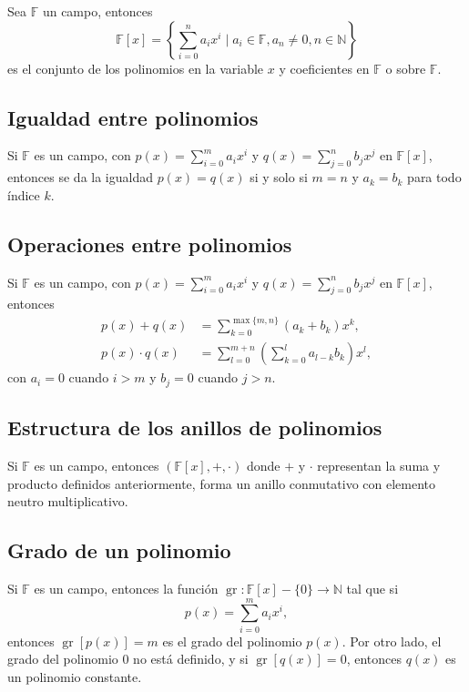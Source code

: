 \documentclass{article}
\DeclareMathOperator{\gr}{gr}
\begin{document}
Sea $\mathbb{F}$ un campo, entonces 
$$\mathbb{F}[x]=\left\{\sum_{i=0}^n a_ix^i \mid a_i\in\mathbb{F}, a_n\neq 0, n\in\mathbb{N}\right\}$$ 
es el conjunto de los polinomios en la variable $x$ y coeficientes en $\mathbb{F}$ o sobre $\mathbb{F}$.

\subsection*{\color{violet} Igualdad entre polinomios}

Si $\mathbb{F}$ es un campo, con $p(x)=\displaystyle \sum_{i=0}^m a_ix^i$ y $q(x)=\displaystyle \sum_{j=0}^n b_jx^j$ en $\mathbb{F}[x]$, entonces se da la igualdad $p(x)=q(x)$ si y solo si $m=n$ y $a_k=b_k$ para todo índice $k$.

\subsection*{\color{violet} Operaciones entre polinomios}

Si $\mathbb{F}$ es un campo, con $p(x)=\displaystyle \sum_{i=0}^m a_ix^i$ y $q(x)=\displaystyle \sum_{j=0}^n b_jx^j$ en $\mathbb{F}[x]$, entonces
\begin{align*}
p(x)+q(x)&=\sum_{k=0}^{\max\{m,n\}}(a_k+b_k)x^k,\\
p(x)\cdot q(x)&=\sum_{l=0}^{m+n}\left(\sum_{k=0}^l a_{l-k}b_k\right)x^l,
\end{align*}
con $a_i=0$ cuando $i>m$ y $b_j=0$ cuando $j>n$.

\subsection*{\color{purple} Estructura de los anillos de polinomios}

Si $\mathbb{F}$ es un campo, entonces $(\mathbb{F}[x],+,\cdot)$ donde $+$ y $\cdot$ representan la suma y producto definidos anteriormente, forma un anillo conmutativo con elemento neutro multiplicativo.

\subsection*{\color{violet} Grado de un polinomio}

Si $\mathbb{F}$ es un campo, entonces la función $\gr: \mathbb{F}[x]-\{0\}\to \mathbb{N}$ tal que si
$$p(x)=\sum_{i=0}^m a_ix^i,$$
entonces $\gr[p(x)]=m$ es el grado del polinomio $p(x)$. Por otro lado, el grado del polinomio 0 no está definido, y si $\gr[q(x)]=0$, entonces $q(x)$ es un polinomio constante.
\end{document}
